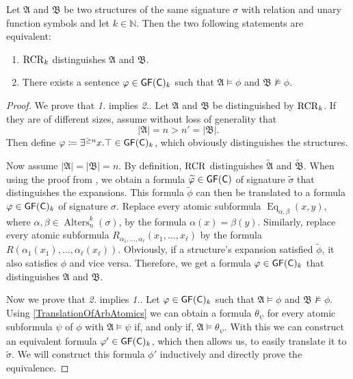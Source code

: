 \begin{theorem}
	\label{thm:ThmB}
	Let $\mathfrak A$ and $\mathfrak B$ be two structures of the same signature $\sigma$ with relation and unary function symbols and let $k\in \mathbb{N}$.
	Then the two following statements are equivalent:
	\begin{enumerate}
		\item $\operatorname{RCR}_k$ distinguishes $\mathfrak A$ and $\mathfrak B$.
		\item There exists a sentence $\varphi\in\mathsf{GF}(\mathsf{C})_k$ such that $\mathfrak A\models \phi$ and $\mathfrak B\not\models \phi$.
	\end{enumerate}
\end{theorem}
\begin{proof}
	We prove that \emph{1.} implies \emph{2.}. 
	Let $\mathfrak A$ and $\mathfrak B$ be distinguished by $\operatorname{RCR}_k$.
	If they are of different sizes, assume without loss of generality that 
	$$\vert \mathfrak A \vert =n > n'=\vert \mathfrak B \vert.$$
	Then define $\varphi\coloneqq \exists^{\geq n} x. \top\in \mathsf{GF}(\mathsf{C})_k$, which obviously distinguishes the structures.
	
	Now assume $\vert \mathfrak A\vert = \vert \mathfrak B \vert = n$.
	By definition, $\operatorname{RCR}$ distinguishes $\widetilde{\mathfrak A}$ and $\widetilde{\mathfrak B}$.
	When using the proof from \cite{scheidt2025ColorRefinement}, we obtain a formula $\widetilde{\varphi}\in \mathsf{GF}(\mathsf{C})$ of signature $\widetilde{\sigma}$ that distinguishes the expansions.
	This formula $\widetilde{\phi}$ can then be translated to a formula $\varphi\in\mathsf{GF}(\mathsf{C})_k$ of signature $\sigma$.
	Replace every atomic subformula $\operatorname{Eq}_{\alpha,\beta}(x,y)$, where $\alpha,\beta\in \operatorname{Alters}_n^k(\sigma)$,  by the formula $\alpha(x)=\beta(y)$.
	Similarly, replace every atomic subformula $R_{\alpha_1,\dots,\alpha_\ell}(x_1,\dots,x_\ell)$ by the formula $R(\alpha_1(x_1),\dots,\alpha_\ell(x_\ell))$.
	Obviously, if a structure's expansion satisfied $\widetilde{\phi}$, it also satisfies $\phi$ and vice versa.
	Therefore, we get a formula $\varphi\in \mathsf{GF}(\mathsf{C})_k$ that distinguishes $\mathfrak A$ and $\mathfrak B$.
	
	Now we prove that \emph{2.} implies \emph{1.}.
	Let $\varphi\in \mathsf{GF}(\mathsf{C})_k$ such that $\mathfrak A\models \phi$ and $\mathfrak B\not\models \phi$.
	Using \cref{TranslationOfArbAtomics} we can obtain a formula $\theta_\psi$ for every atomic subformula $\psi$ of $\phi$ with $\mathfrak A\models \psi$ if, and only if, $\mathfrak A\models \theta_\psi$.
	With this we can construct an equivalent formula $\varphi'\in\mathsf{GF}(\mathsf{C})_k$, which then allows us, to easily translate it to $\widetilde{\sigma}$.
	We will construct this formula $\phi'$ inductively and directly prove the equivalence.
	

\end{proof}
